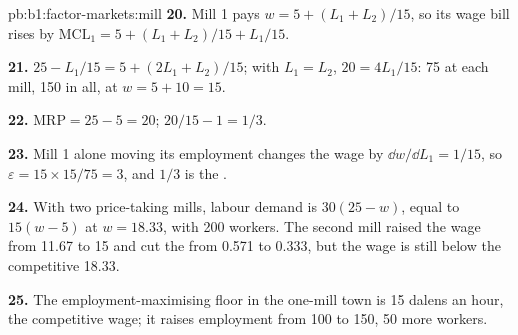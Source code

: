 \begin{solution}{pb:b1:factor-markets:mill}
\textbf{20.} Mill 1 pays $w = 5 + (L_1 + L_2)/15$, so its wage bill rises by
$\mathrm{MCL}_1 = 5 + (L_1 + L_2)/15 + L_1/15$.

\textbf{21.} $25 - L_1/15 = 5 + (2L_1 + L_2)/15$; with $L_1 = L_2$, $20 = 4L_1/15$: 75 at each
mill, 150 in all, at $w = 5 + 10 = 15$.

\textbf{22.} $\mathrm{MRP} = 25 - 5 = 20$;  $20/15 - 1 = 1/3$.

\textbf{23.} Mill 1 alone moving its employment changes the wage by
$\dd w/\dd L_1 = 1/15$, so $\varepsilon = 15 \times 15/75 = 3$, and $1/3$ is the .

\textbf{24.} With two price-taking mills, labour demand is $30(25 - w)$, equal
to $15(w - 5)$ at $w = 18.33$, with 200 workers. The second mill raised the wage
from 11.67 to 15 and cut the  from 0.571 to 0.333, but the wage is
still below the competitive 18.33.

\textbf{25.} The employment-maximising floor in the one-mill town is 15
dalens an hour, the competitive wage; it raises employment from 100 to 150,
50 more workers.
\end{solution}
